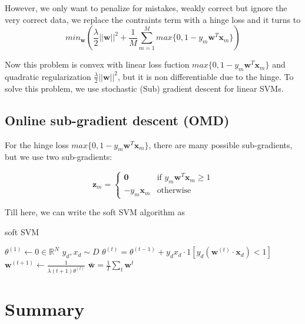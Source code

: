 \documentclass[11pt]{article}
\begin{document}
However, we only want to penalize for mistakes, weakly correct but ignore the very correct data, we replace the contraints term with a hinge loss and it turns to
\begin{equation}
     min_{\textbf{w}} (\frac{\lambda}{2}||\textbf{w}||^2 + \frac{1}{M} \sum_{m=1}^{M} max\{0, 1 - y_m \textbf{w}^T \textbf{x}_m\})
\end{equation}

Now this problem is convex with linear loss fuction $max\{0, 1 - y_m \textbf{w}^T \textbf{x}_m\}$ and quadratic regularization $\frac{\lambda}{2}||\textbf{w}||^2$, but it is non differentiable due to the hinge.
To solve this problem, we use stochastic (Sub) gradient descent for linear SVMs.

\subsection{Online sub-gradient descent (OMD)}
For the hinge loss $max\{0, 1 - y_m \textbf{w}^T \textbf{x}_m\}$, there are many possible sub-gradients, but we use two sub-gradients:

\begin{equation}
  \textbf{z}_m =
    \begin{cases}
      \textbf{0} & \text{if $y_m \textbf{w}^T \textbf{x}_m \geq 1$}\\
      -y_m \textbf{x}_m & \text{otherwise}
    \end{cases}       
\end{equation}

Till here, we can write the soft SVM algorithm as 

\begin{algorithm}
\caption{soft SVM}
\begin{algorithmic}[1]

\State $\theta^{(1)} \leftarrow 0 \in \mathbb{R}^N$
        \State $y_d, x_d \sim D$
        \State $\theta^{(t)} = \theta^{(t-1)} + y_d x_d \cdot 1[y_d (\textbf{w}^{(t)} \cdot \textbf{x}_d) < 1]$
        \State $\textbf{w}^{(t+1)} \leftarrow \frac{1}{\lambda (t+1)\theta^{(t)}}$
    \EndFor
\State $\bar{\textbf{w}} = \frac{1}{T} \sum_{t} \textbf{w}^t$

\end{algorithmic}
\end{algorithm}


\section{Summary}
\end{document}
